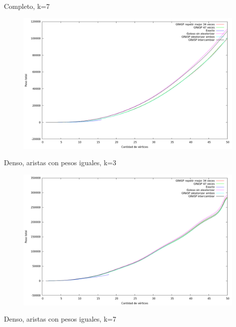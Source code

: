 Completo, k=7

\begin{figure}[H]
  \begin{center}
    \includegraphics[scale=0.35]{imagenes/ej6-completo-k7-peso.png}
  \end{center}
\end{figure}

Denso, aristas con pesos iguales, k=3

\begin{figure}[H]
  \begin{center}
    \includegraphics[scale=0.35]{imagenes/ej6-denso-pesos-iguales-k3-peso.png}
  \end{center}
\end{figure}

Denso, aristas con pesos iguales, k=7

